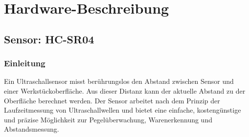 %
%
%


\chapter{Hardware-Beschreibung}
\section{Sensor: HC-SR04}
\subsection{Einleitung}
Ein Ultraschallsensor misst berührungslos den Abstand zwischen Sensor und einer Werkstückoberfläche. Aus dieser Distanz kann der aktuelle Abstand zu der Oberfläche berechnet werden. Der Sensor arbeitet nach dem Prinzip der Laufzeitmessung von Ultraschallwellen und bietet eine einfache, kostengünstige und präzise Möglichkeit zur Pegelüberwachung, Warenerkennung und Abstandsmessung.\cite{Arduino:2024} \cite{Traenkler:2018} \cite{Hering:2023}

